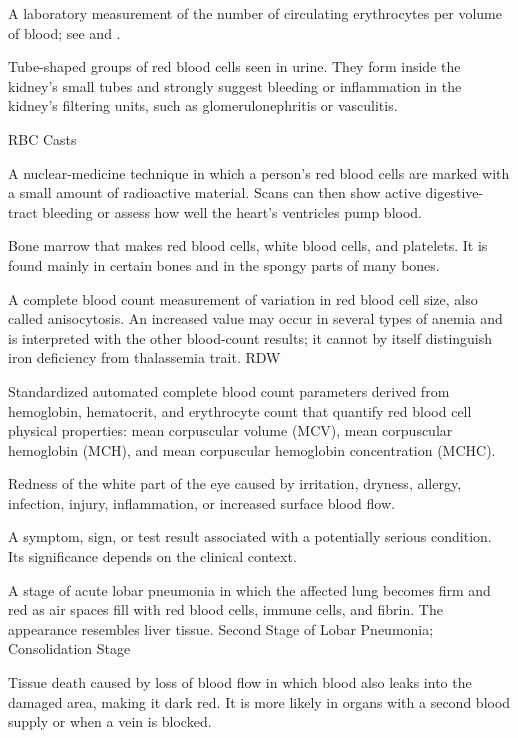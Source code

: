  A laboratory measurement of the number of circulating erythrocytes per volume of blood; see  and .

 Tube-shaped groups of red blood cells seen in urine. They form inside the kidney's small tubes and strongly suggest bleeding or inflammation in the kidney's filtering units, such as glomerulonephritis or vasculitis.

\synonyms
RBC Casts

 A nuclear-medicine technique in which a person’s red blood cells are marked with a small amount of radioactive material. Scans can then show active digestive-tract bleeding or assess how well the heart’s ventricles pump blood.

 Bone marrow that makes red blood cells, white blood cells, and platelets. It is found mainly in certain bones and in the spongy parts of many bones.

 A complete blood count measurement of variation in red blood cell size, also called anisocytosis. An increased value may occur in several types of anemia and is interpreted with the other blood-count results; it cannot by itself distinguish iron deficiency from thalassemia trait.
\synonyms
RDW

 Standardized automated complete blood count parameters derived from hemoglobin, hematocrit, and erythrocyte count that quantify red blood cell physical properties: mean corpuscular volume (MCV), mean corpuscular hemoglobin (MCH), and mean corpuscular hemoglobin concentration (MCHC).

 Redness of the white part of the eye caused by irritation, dryness, allergy, infection, injury, inflammation, or increased surface blood flow.

 A symptom, sign, or test result associated with a potentially serious condition. Its significance depends on the clinical context.

 A stage of acute lobar pneumonia in which the affected lung becomes firm and red as air spaces fill with red blood cells, immune cells, and fibrin. The appearance resembles liver tissue.
\synonyms
Second Stage of Lobar Pneumonia; Consolidation Stage

 Tissue death caused by loss of blood flow in which blood also leaks into the damaged area, making it dark red. It is more likely in organs with a second blood supply or when a vein is blocked.

